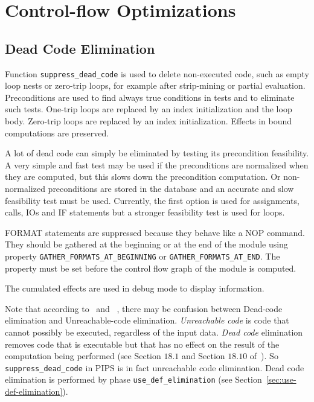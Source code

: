 \documentclass[a4paper]{report}
\begin{document}


\section{Control-flow Optimizations}


\subsection{Dead Code Elimination}
\label{sec:dead-code-elimination}

Function \verb+suppress_dead_code+ is used to delete non-executed code,
such as empty loop nests or zero-trip loops, for example after
strip-mining or partial evaluation. Preconditions are used to find always
true conditions in tests and to eliminate such tests. One-trip loops are
replaced by an index initialization and the loop body. Zero-trip loops are
replaced by an index initialization. Effects in bound computations are
preserved.

A lot of dead code can simply be eliminated by testing its precondition
feasibility. A very simple and fast test may be used if the preconditions
are normalized when they are computed, but this slows down the
precondition computation. Or non-normalized preconditions are stored in
the database and an accurate and slow feasibility test must be used.
Currently, the first option is used for assignments, calls, IOs and IF
statements but a stronger feasibility test is used for loops.

FORMAT statements are suppressed because they behave like a NOP command.
They should be gathered at the beginning or at the end of the module using
property \texttt{GATHER\_FORMATS\_AT\_BEGINNING} or
\texttt{GATHER\_FORMATS\_AT\_END}. The property must be set before the
control flow graph of the module is computed.

The cumulated effects are used in debug mode to display information.

Note that according to~\cite{Aho86}
and~\cite{Much97} , there may be confusion between Dead-code elimination
and Unreachable-code elimination. {\em Unreachable code} is code that
cannot possibly be executed, regardless of the input data. {\em Dead code}
elimination removes code that is executable but that has no effect on the
result of the computation being performed (see Section $18.1$ and Section
$18.10$ of~\cite{Much97}). So \verb+suppress_dead_code+ in PIPS is in
fact unreachable code elimination. Dead code elimination is performed by
phase \verb|use_def_elimination| (see Section~\ref{sec:use-def-elimination}).
\end{document}
